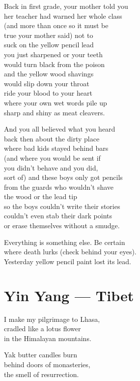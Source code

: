 \documentclass[twoside,10pt]{book}
\begin{document}
Back in first grade, your mother told you\\
her teacher had warned her whole class\\
(and more than once so it must be\\
true your mother said) not to\\
suck on the yellow pencil lead\\
you just sharpened or your teeth\\
would turn black from the poison\\
and the yellow wood shavings\\
would slip down your throat\\
ride your blood to your heart\\
where your own wet words pile up\\
sharp and shiny as meat cleavers.

And you all believed what you heard\\
back then about the dirty place\\
where bad kids stayed behind bars\\
(and where you would be sent if\\
you didn't behave and you did,\\
sort of) and these boys only got pencils\\
from the guards who wouldn't shave\\
the wood or the lead tip\\
so the boys couldn't write their stories\\
couldn't even stab their dark points\\
or erase themselves without a smudge.

Everything is something else. Be certain\\
where death lurks (check behind your eyes).\\
Yesterday yellow pencil paint lost its lead.


\clearpage
\section{Yin Yang --- Tibet}

I make my pilgrimage to Lhasa,\\
cradled like a lotus flower\\
in the Himalayan mountains.

Yak butter candles burn\\
behind doors of monasteries,\\
the smell of resurrection.
\end{document}
